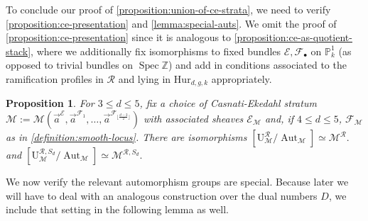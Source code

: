 \documentclass[12 pt]{amsart}
\newcommand{\rboxed}[1]{#1}
\theoremstyle{plain}
\newtheorem{proposition}[theorem]{Proposition}
\theoremstyle{definition}
\theoremstyle{remark}
\numberwithin{equation}{section}
\newcommand\bp{\mathbb P}
\newcommand\bz{\mathbb Z}
\newcommand\sce{\mathscr E}
\newcommand\scf{\mathscr F}
\DeclareMathOperator\spec{\operatorname{Spec}}
\newcommand\hur[3]{\mathrm{Hur}_{#1,#2,#3}} %
\newcommand\ce{\mathscr M} %
\newcommand\rce[1]{\mathscr M^{#1}} %
\newcommand\ramlocus[2]{\mathrm{U}_{#1}^{#2}} %
\DeclareMathOperator\aut{Aut}
\begin{document}
To conclude our proof of \autoref{proposition:union-of-ce-strata},
we need to verify \autoref{proposition:ce-presentation}
and \autoref{lemma:special-auts}.
We omit the proof of 
\autoref{proposition:ce-presentation}
since it is analogous to
\autoref{proposition:ce-as-quotient-stack}, where we additionally fix
isomorphisms to fixed bundles $\sce, \scf_\bullet$ on $\bp^1_k$ (as opposed to
trivial bundles on $\spec \bz$) and add in conditions associated to
the ramification profiles in $\mathcal R$ and lying in $\hur d g k$ appropriately.

\begin{proposition} \label{proposition:ce-presentation} For $3 \leq d \leq 5$, 
	fix a choice of Casnati-Ekedahl stratum $\rboxed{\ce} :=
	\ce(\vec a^\sce, \vec a^{\scf_1} , \ldots, \vec a^{\scf_{\lfloor \frac{d-2}{2} \rfloor}})$ with
	associated sheaves $\sce_\ce$ and, if $4 \leq d \leq 5$, $\scf_\ce$ as
	in \autoref{definition:smooth-locus}.  There are isomorphisms
	$[\ramlocus \ce {\mathcal R} / \aut_{\ce}] \simeq \rce {\mathcal R}.$
	and
	$[\ramlocus \ce {\mathcal R, S_d} / \aut_{\ce}] \simeq \rce {\mathcal R,
	S_d}.$
\end{proposition}

We now verify the relevant automorphism groups are special.
Because later we will have to deal with an analogous
construction over the dual numbers $D$, we include that setting in the
following lemma as well.
\end{document}
